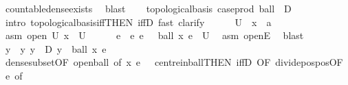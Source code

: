 \begin{isabellebody}
\ countable{\isacharunderscore}{\kern0pt}dense{\isacharunderscore}{\kern0pt}exists\ \isamarkupfalse%
\ blast\isanewline
\ \ \isamarkupfalse%
\ {\isachardoublequoteopen}topological{\isacharunderscore}{\kern0pt}basis\ {\isacharparenleft}{\kern0pt}case{\isacharunderscore}{\kern0pt}prod\ ball\ {\isacharbackquote}{\kern0pt}\ {\isacharparenleft}{\kern0pt}D\ {\isasymtimes}\ {\isacharparenleft}{\kern0pt}{\isasymrat}\ {\isasyminter}\ {\isacharbraceleft}{\kern0pt}{}{\isacharless}{\kern0pt}{\isachardot}{\kern0pt}{\isachardot}{\kern0pt}{\isacharbraceright}{\kern0pt}{\isacharparenright}{\kern0pt}{\isacharparenright}{\kern0pt}{\isacharparenright}{\kern0pt}{\isachardoublequoteclose}\isanewline
\ \ \isamarkupfalse%
\ {\isacharparenleft}{\kern0pt}intro\ topological{\isacharunderscore}{\kern0pt}basis{\isacharunderscore}{\kern0pt}iff{\isacharbrackleft}{\kern0pt}THEN\ iffD{}{\isacharbrackright}{\kern0pt}{\isacharcomma}{\kern0pt}\ fast{\isacharcomma}{\kern0pt}\ clarify{\isacharparenright}{\kern0pt}\isanewline
\ \ \ \ \isamarkupfalse%
\ U\ \ x\ {\isacharcolon}{\kern0pt}{\isacharcolon}{\kern0pt}\ {\isacharprime}{\kern0pt}a\ \isamarkupfalse%
\ asm{\isacharcolon}{\kern0pt}\ {\isachardoublequoteopen}open\ U{\isachardoublequoteclose}\ {\isachardoublequoteopen}x\ {\isasymin}\ U{\isachardoublequoteclose}\isanewline
\ \ \ \ \isamarkupfalse%
\ e\ \ e{\isacharcolon}{\kern0pt}\ {\isachardoublequoteopen}e\ {\isachargreater}{\kern0pt}\ {}{\isachardoublequoteclose}\ {\isachardoublequoteopen}ball\ x\ e\ {\isasymsubseteq}\ U{\isachardoublequoteclose}\ \isamarkupfalse%
\ asm\ openE\ \isamarkupfalse%
\ blast\isanewline
\ \ \ \ \isamarkupfalse%
\ y\ \ y{\isacharcolon}{\kern0pt}\ {\isachardoublequoteopen}y\ {\isasymin}\ D{\isachardoublequoteclose}\ {\isachardoublequoteopen}y\ {\isasymin}\ ball\ x\ {\isacharparenleft}{\kern0pt}e\ {\isacharslash}{\kern0pt}\ {}{\isacharparenright}{\kern0pt}{\isachardoublequoteclose}\ \isamarkupfalse%
\ dense{\isacharunderscore}{\kern0pt}subset{\isacharparenleft}{\kern0pt}{}{\isacharparenright}{\kern0pt}{\isacharbrackleft}{\kern0pt}OF\ open{\isacharunderscore}{\kern0pt}ball{\isacharcomma}{\kern0pt}\ of\ x\ {\isachardoublequoteopen}e\ {\isacharslash}{\kern0pt}\ {}{\isachardoublequoteclose}{\isacharbrackright}{\kern0pt}\ centre{\isacharunderscore}{\kern0pt}in{\isacharunderscore}{\kern0pt}ball{\isacharbrackleft}{\kern0pt}THEN\ iffD{}{\isacharcomma}{\kern0pt}\ OF\ divide{\isacharunderscore}{\kern0pt}pos{\isacharunderscore}{\kern0pt}pos{\isacharbrackleft}{\kern0pt}OF\ e{\isacharparenleft}{\kern0pt}{}{\isacharparenright}{\kern0pt}{\isacharcomma}{\kern0pt}\ of\ {}{\isacharbrackright}{\kern0pt}{\isacharbrackright}{\kern0pt}\ \isamarkupfalse%

\end{isabellebody}
